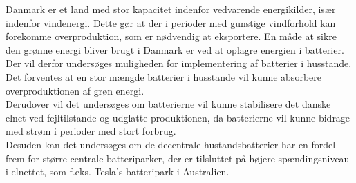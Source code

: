 
\label{Problemformulering}
Danmark er et land med stor kapacitet indenfor vedvarende energikilder, især indenfor vindenergi. Dette gør at der i perioder med gunstige vindforhold kan forekomme overproduktion, som er nødvendig at eksportere. En måde at sikre den grønne energi bliver brugt i Danmark er ved at oplagre energien i batterier. \\
Der vil derfor undersøges muligheden for implementering af batterier i husstande. Det forventes at en stor mængde batterier i husstande vil kunne absorbere overproduktionen af grøn energi. \\
Derudover vil det undersøges om batterierne vil kunne stabilisere det danske elnet ved fejltilstande og udglatte produktionen, da batterierne vil kunne bidrage med strøm i perioder med stort forbrug. \\
Desuden kan det undersøges om de decentrale hustandsbatterier har en fordel frem for større centrale batteriparker, der er tilsluttet på højere spændingsniveau i elnettet, som f.eks. Tesla’s batteripark i Australien.
